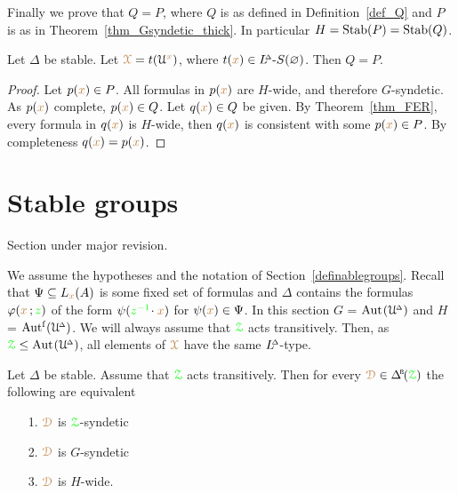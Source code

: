Finally we prove that $Q=P$, where $Q$ is as defined in Definition~\ref{def_Q} and $P$ is as in Theorem~\ref{thm_Gsyndetic_thick}.
In particular $H={\rm Stab}(P)={\rm Stab}(Q)$.

\begin{theorem}\label{thm_P=Q}
  Let $\Delta$ be stable.
  Let ${\color{brown}\EuScript X}=t(\EuScript U^{\color{brown} x})$, where $t({\color{brown} x})\in L\kern-.5ex^{\scriptscriptstyle\Delta}\mbox{-}S(\varnothing)$.  
  Then $Q=P$.%
\end{theorem}

\begin{proof}
  Let $p({\color{brown} x})\in P$.
  All formulas in $p({\color{brown} x})$ are $H$-wide, and therefore $G$-syndetic.
  As $p({\color{brown} x})$ complete, $p({\color{brown} x})\in Q$.
  Let $q({\color{brown} x})\in Q$ be given.
  By Theorem~\ref{thm_FER}, every formula in $q({\color{brown} x})$ is $H$-wide, then $q({\color{brown} x})$ is consistent with some $p({\color{brown} x})\in P$.
  By completeness $q({\color{brown} x})=p({\color{brown} x})$.
\end{proof}


\section{Stable groups}\label{stable_groups}


\noindent\llap{\textcolor{red}{\Large\warning}\kern1.5ex}\ignorespaces
Section under major revision.

We assume the hypotheses and the notation of Section~\ref{definablegroups}.
Recall that $\Psi\subseteq L_{\color{brown} x}(A)$ is some fixed set of formulas and \emph{$\Delta$\/} contains the formulas $\varphi({\color{brown} x}\,;{\color{green} z})$ of the form  $\psi({\color{green} z^{-1}}\!\cdot{\color{brown}x})$ for $\psi({\color{brown} x})\in\Psi$.
In this section \emph{$G$\/} = ${\rm Aut\kern.15ex}(\EuScript U\kern-.2ex^{\scriptscriptstyle\Delta})$ and \emph{$H$\/} = $\mbox{Aut$^{\rm f}$}(\EuScript U\kern-.2ex^{\scriptscriptstyle\Delta})$.
We will always assume that ${\color{green}\EuScript Z}$ acts transitively. 
Then, as ${\color{green}\EuScript Z}\le{\rm Aut\kern.15ex}(\EuScript U\kern-.2ex^{\scriptscriptstyle\Delta})$, all elements of ${\color{brown}\EuScript X}$ have the same $L\kern-.5ex^{\scriptscriptstyle\Delta}$-type.

\begin{theorem}
  Let $\Delta$ be stable.
  Assume that ${\color{green}\EuScript Z}$ acts transitively.
  Then for every $\mrD\in\BDelta(\grZ)$ the following are equivalent
  \begin{itemize}
  \item [1.] ${\color{brown}\EuScript D}$ is ${\color{green}\EuScript Z}$-syndetic
  \item [2.] ${\color{brown}\EuScript D}$ is $G$-syndetic
  \item [3.] ${\color{brown}\EuScript D}$ is $H$-wide.
  \end{itemize}\smallskip
\end{theorem}

